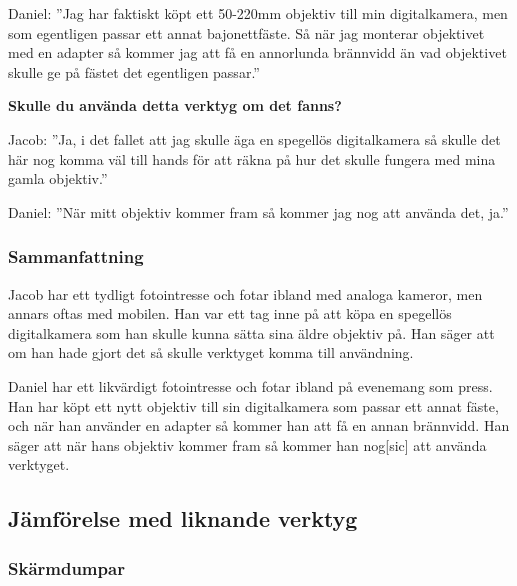 \documentclass[11pt]{article}
\begin{document}
\sloppy
Daniel: ”Jag har faktiskt köpt ett 50-220mm objektiv till min digitalkamera, men
som egentligen passar ett annat bajonettfäste. Så när jag monterar objektivet
med en adapter så kommer jag att få en annorlunda brännvidd än vad objektivet
skulle ge på fästet det egentligen passar.”\par
\fussy

\textbf{Skulle du använda detta verktyg om det fanns?}\par

Jacob: ”Ja, i det fallet att jag skulle äga en spegellös digitalkamera så
skulle det här nog komma väl till hands för att räkna på hur det skulle fungera
med mina gamla objektiv.”\par

Daniel: ”När mitt objektiv kommer fram så kommer jag nog att använda det, ja.”
\par


\subsubsection{Sammanfattning}
\sloppy
Jacob har ett tydligt fotointresse och fotar ibland med analoga kameror, men
annars oftas med mobilen. Han var ett tag inne på att köpa en spegellös
digitalkamera som han skulle kunna sätta sina äldre objektiv på. Han säger att
om han hade gjort det så skulle verktyget komma till användning.\par

Daniel har ett likvärdigt fotointresse och fotar ibland på evenemang som press.
Han har köpt ett nytt objektiv till sin digitalkamera som passar ett annat
fäste, och när han använder en adapter så kommer han att få en annan brännvidd.
Han säger att när hans objektiv kommer fram så kommer han nog[sic] att använda
verktyget. \par
\fussy

\subsection{Jämförelse med liknande verktyg}
\subsubsection{Skärmdumpar}
\renewcommand{\figurename}{Fig.}
\end{document}

